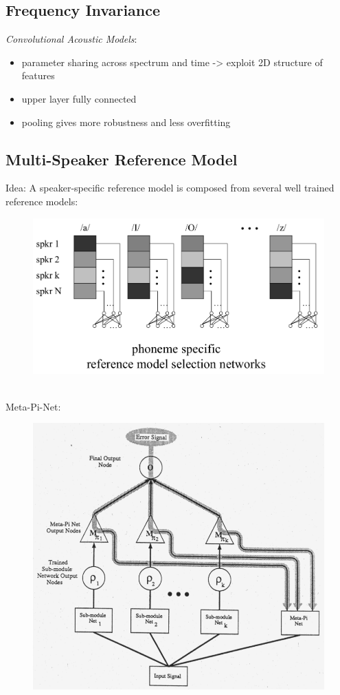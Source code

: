 \subsection{Frequency Invariance}
\label{ssect:frequency-invariance}
\textit{Convolutional Acoustic Models}:
\begin{itemize}
	\item parameter sharing across spectrum and time -> exploit 2D structure of features
	\item upper layer fully connected
	\item pooling gives more robustness and less overfitting
\end{itemize}

\subsection{Multi-Speaker Reference Model}
\label{ssect:multi-speaker-reference-model}
Idea: A speaker-specific reference model is composed from several well trained reference models:
\begin{figure}[h]
\includegraphics[scale=0.4]{phoneme-specific-reference-model-selection-networks}
\end{figure}\\
Meta-Pi-Net:
\begin{figure}[h]
\includegraphics[scale=0.4]{meta-pi-model}
\end{figure}\\

